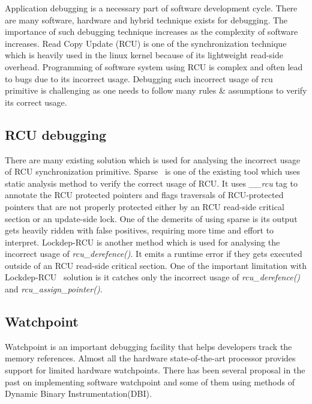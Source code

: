 Application debugging is a necessary part of software development cycle. There are many software, hardware and hybrid technique exists for debugging. The importance of such debugging technique increases as the complexity of software increases. Read Copy Update (RCU) is one of the synchronization technique which is heavily used in the linux kernel because of its lightweight read-side overhead. Programming of software system using RCU is complex and often lead to bugs due to its incorrect usage. Debugging such incorrect usage of rcu primitive is challenging as one needs to follow many rules \& assumptions to verify its correct usage. 

\subsection{RCU debugging}
There are many existing solution which is used for analysing the incorrect usage of RCU synchronization primitive. Sparse~\cite{sparse} is one of the existing tool which uses static analysis method to verify the correct usage of RCU. It uses \emph{\_\_rcu} tag to annotate the RCU protected pointers and flags traversals of RCU-protected pointers that are not properly protected either by an RCU read-side critical section or an update-side lock. One of the demerits of using sparse is its output gets heavily ridden with false positives, requiring more time and effort to interpret. Lockdep-RCU is another method which is used for analysing the incorrect usage of \emph{rcu\_derefence()}. It emits a runtime error if they gets executed outside of an RCU read-side critical section. One of the important limitation with Lockdep-RCU~\cite{PaulEMcKenney2010LockdepRCU} solution is it catches only the incorrect usage of \emph{rcu\_derefence()} and \emph{rcu\_assign\_pointer()}. 

\subsection{Watchpoint}
Watchpoint is an important debugging facility that helps developers track the memory references. Almost all the hardware state-of-the-art processor provides support for limited hardware watchpoints. There has been several proposal in the past on implementing software watchpoint and some of them using methods of Dynamic Binary Instrumentation(DBI).
